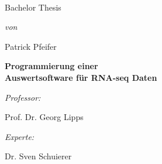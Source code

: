 \begin{titlepage}
\thispagestyle{plain}
\setlength\parindent{0pt}
\begin{center}
~

\vspace{1cm}
	{ \LARGE Bachelor Thesis \par }

\vspace{2cm}
	{ \large \emph{von} \par }
	Patrick Pfeifer

\vspace{3cm}
	{ \sffamily\LARGE \bfseries
	Programmierung einer\\ Auswertsoftware für RNA-seq Daten \par }

\vspace{6cm}
	\begin{minipage}{0.5\textwidth}
	\begin{flushleft}
		{ \large \emph{Professor:} \par }
		Prof. Dr. Georg Lipps
	\end{flushleft}
	\end{minipage}%
	\begin{minipage}{0.5\textwidth}
	\begin{flushright}
		{ \large \emph{Experte:} \par }
		Dr. Sven Schuierer
	\end{flushright}
	\end{minipage}

\end{center}
\end{titlepage}

